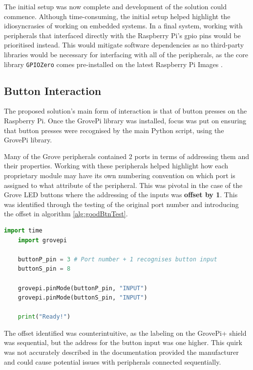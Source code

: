 The initial setup was now complete and development of the solution could commence. Although time-consuming, the initial setup helped highlight the idiosyncrasies of working on embedded systems. In a final system, working with peripherals that interfaced directly with the Raspberry Pi's \gls{gpio} pins would be prioritised instead. This would mitigate software dependencies as no third-party libraries would be necessary for interfacing with all of the peripherals, as the core library \texttt{GPIOZero} comes pre-installed on the latest Raspberry Pi Images \citep{bennuttal2024}. 

\subsection{Button Interaction}\label{subsec:btnint}
The proposed solution's main form of interaction is that of button presses on the Raspberry Pi. Once the GrovePi library was installed, focus was put on ensuring that button presses were recognised by the main Python script, using the GrovePi library.

Many of the Grove peripherals contained 2 ports in terms of addressing them and their properties. Working with these peripherals helped highlight how each proprietary module may have its own numbering convention on which port is assigned to what attribute of the peripheral. This was pivotal in the case of the Grove LED buttons where the addressing of the inputs was \textbf{offset by 1}. This was identified through the testing of the original port number and introducing the offset in algorithm \ref{alg:goodBtnTest}.

\begin{algorithm}[H]
    \caption{Successful Button Port Test - Python}
    \label{alg:goodBtnTest}
    \begin{lstlisting}[language=Python]
    import time
    import grovepi

    buttonP_pin = 3 # Port number + 1 recognises button input
    buttonS_pin = 8

    grovepi.pinMode(buttonP_pin, "INPUT")
    grovepi.pinMode(buttonS_pin, "INPUT")

    print("Ready!")
    \end{lstlisting}
\end{algorithm}
The offset identified was counterintuitive, as the labeling on the GrovePi+ shield was sequential, but the address for the button input was one higher. This quirk was not accurately described in the documentation provided the manufacturer and could cause potential issues with peripherals connected sequentially. 

